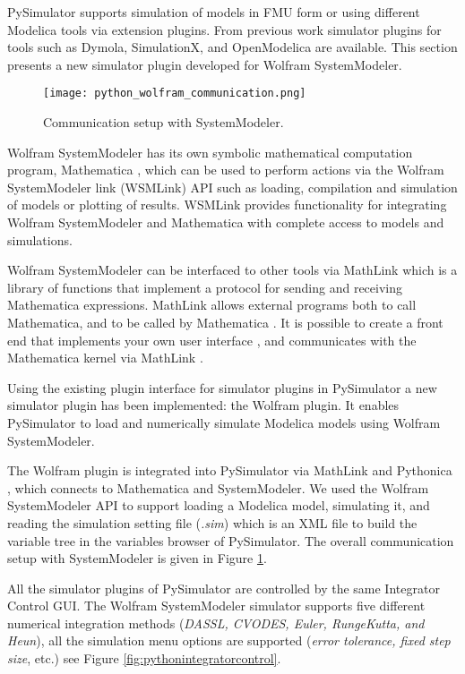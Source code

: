 PySimulator supports simulation of models in FMU form or using different Modelica tools via extension
plugins. From previous work simulator plugins for tools such as Dymola, SimulationX, and OpenModelica are available. 
This section presents a new simulator plugin developed for Wolfram SystemModeler.

\begin{figure}
	\texttt{[image: python\_wolfram\_communication.png]}
	\caption{Communication setup with SystemModeler.}
	\label{fig:pythonwolframcommunication}
\end{figure}

Wolfram SystemModeler has its own symbolic mathematical computation program, Mathematica \cite{mathematica}, which can be used
to perform actions via the Wolfram SystemModeler link (WSMLink) API \cite{wsmlink} such as loading, compilation and 
simulation of models or plotting of results. WSMLink provides functionality for integrating Wolfram SystemModeler and Mathematica  
with complete access to models and simulations.

Wolfram SystemModeler can be interfaced to other tools via MathLink \cite{mathlink} which is a library of functions that 
implement a protocol for sending and receiving Mathematica expressions. MathLink \cite{mathlinktutorial,mathlink} allows external
programs both to call Mathematica, and to be called by Mathematica . It is possible to create a front end that 
implements your own user interface , and communicates with the Mathematica kernel via MathLink \cite{mathlinkc}.

Using the existing plugin interface for simulator plugins in PySimulator a new simulator plugin has
been implemented: the Wolfram plugin. It enables PySimulator to load and numerically simulate
Modelica models using Wolfram SystemModeler.

The Wolfram plugin is integrated into PySimulator via MathLink and Pythonica \cite{pythonica}, which connects to Mathematica and
SystemModeler. We used the Wolfram SystemModeler API to support loading a Modelica model, simulating
it, and reading the simulation setting file (\textit{.sim}) which is an XML file to build the variable tree in the
variables browser of PySimulator. The overall communication setup with SystemModeler is given in
Figure \ref{fig:pythonwolframcommunication}.

All the simulator plugins of PySimulator are controlled by the same Integrator Control GUI. The Wolfram
SystemModeler simulator supports five different numerical integration methods (\textit{DASSL, CVODES,
Euler, RungeKutta, and Heun}), all the simulation menu options are supported (\textit{error tolerance, fixed step
size}, etc.) see Figure \ref{fig:pythonintegratorcontrol}.

